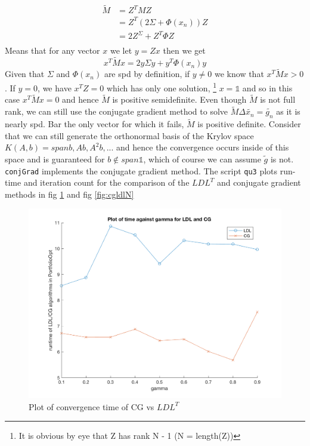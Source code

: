 \documentclass[paper=a4, fontsize=12pt]{scrartcl} %
\numberwithin{equation}{section}       %
\numberwithin{figure}{section}         %
\numberwithin{table}{section}          %
\begin{document}
\begin{align*}
\tilde{M} &= Z^T M Z \\
&= Z^T (2\Sigma + \Phi(x_n)) Z \\
&= 2Z^\Sigma + Z^T \Phi Z \\
\end{align*}
Means that for any vector $x$ we let $y = Zx$ then we get 
$$
x^T \tilde{M} x = 2y\Sigma y + y^T\Phi(x_n) y
$$ 
Given that $\Sigma$ and $\Phi(x_n)$ are spd by definition, if $y \neq 0$ we know that $x^T \tilde{M} x > 0$. If $y = 0$, we have $x^T Z = 0$ which has only one solution, \footnote{It is obvious by eye that Z has rank N - 1 (N = length(Z))} $x = \mathbb{1}$ and so in this case $x^T \tilde{M} x = 0$ and hence $\tilde{M}$ is positive semidefinite.
Even though $\tilde{M}$ is not full rank, we can still use the conjugate gradient method to solve $\tilde{M}\Delta\tilde{x_n} = \tilde{g_n}$ as it is nearly spd. Bar the only vector for which it fails, $\tilde{M}$ is positive definite. Consider that we can still generate the orthonormal basis of the Krylov space $K(A,b) = span{b, Ab, A^2b, ...}$ and hence the convergence occurs inside of this space and is guaranteed for $b \not\in span \mathbb{1}$, which of course we can assume $\tilde{g}$ is not. \\
\noindent\texttt{conjGrad} implements the conjugate gradient method. 
\noindent The script \texttt{qu3} plots run-time and iteration count for the comparison of the $LDL^T$ and conjugate gradient methods in fig \ref{fig:cgldlt} and fig \ref{fig:cgldlN}

\begin{center}
	\begin{figure}[h!]
	  \includegraphics[width=\linewidth]{CGvsLDL_time}
	  \caption{Plot of convergence time of CG vs $LDL^T$}
	  \label{fig:cgldlt}
	\end{figure}
\end{center}
\end{document}
